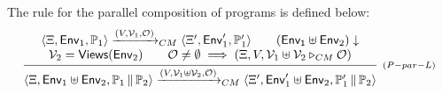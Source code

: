 \documentclass[a4paper,UKenglish]{article}%
\theoremstyle{plain}
\begin{document}
The rule for the parallel composition of programs is defined below: 
\[
\infer[{\scriptstyle (P-par-L)}]
{\langle \hh, \mathsf{Env}_1 \uplus \mathsf{Env}_2, \prog_1 \Par \prog_2 \rangle 
\xrightarrow{(V, \mathcal{V}_1 \uplus \mathcal{V}_2, \mathcal{O})}_{CM} \langle \hh', \mathsf{Env}_1' \uplus \mathsf{Env}_2, 
\prog_1' \Par \prog_2 \rangle }
{ \begin{array}{c}
\langle \hh, \mathsf{Env}_1, \prog_1 \rangle \xrightarrow{(V, \mathcal{V}_1, \mathcal{O})}_{CM} \langle \hh', \mathsf{Env}_1', \prog_1' \rangle
\qquad (\mathsf{Env_1} \uplus \mathsf{Env}_2)\downarrow \\ 
\mathcal{V}_2 = \mathsf{Views}(\mathsf{Env}_2) \qquad 
\mathcal{O} \neq \emptyset \implies (\hh, V, \mathcal{V}_1 \uplus \mathcal{V}_2 \triangleright_{CM} \mathcal{O}) 
\end{array}
}
\]
\end{document}
